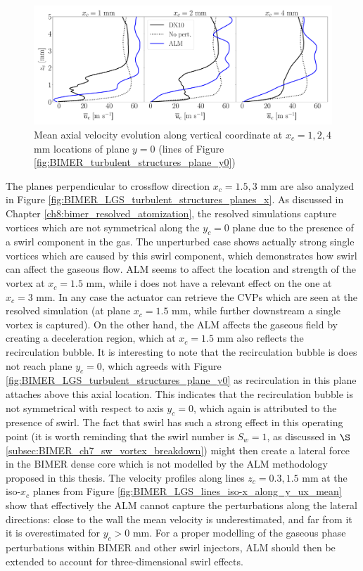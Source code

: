 \begin{figure}[ht]
\centering
   \includegraphics[scale=0.24]{./part3_applications/figures_ch9_lagrangian/gas_field_initial_conditions/lines_y0_along_z_ux_mean}
\caption{Mean axial velocity evolution along vertical coordinate at $x_c = 1, 2, 4$ mm locations of plane $y = 0$ (lines of Figure \ref{fig:BIMER_turbulent_structures_plane_y0})}
\label{fig:BIMER_LGS_lines_y0_along_z_ux_mean}
\end{figure}

The planes perpendicular to crossflow direction $x_c = 1.5, 3$ mm are also analyzed in Figure \ref{fig:BIMER_LGS_turbulent_structures_planes_x}.  As discussed in Chapter \ref{ch8:bimer_resolved_atomization}, the resolved simulations capture vortices which are not symmetrical along the $y_c = 0$ plane due to the presence of a swirl component in the gas. The unperturbed case shows actually strong single vortices which are caused by this swirl component, which demonstrates how swirl can affect the gaseous flow. ALM seems to affect the location and strength of the vortex at $x_c = 1.5$ mm, while i does not have a relevant effect on the one at $x_c = 3$ mm. In any case the actuator can retrieve the CVPs which are seen at the resolved simulation (at plane $x_c = 1.5$ mm, while further downstream a single vortex is captured). On the other hand, the ALM affects the gaseous field by creating a deceleration region, which at $x_c = 1.5$ mm also reflects the recirculation bubble. It is interesting to note that the recirculation bubble is does not reach plane $y_c = 0$, which agreeds with Figure \ref{fig:BIMER_LGS_turbulent_structures_plane_y0}  as recirculation in this plane attaches above this axial location. This indicates that the recirculation bubble is not symmetrical with respect to axis $y_c = 0$, which again is attributed to the presence of swirl. The fact that swirl has such a strong effect in this operating point (it is worth reminding that the swirl number is $S_w = 1$, as discussed in $\S$\ref{subsec:BIMER_ch7_sw_vortex_breakdown}) might then create a lateral force in the BIMER dense core which is not modelled by the ALM methodology proposed in this thesis. The velocity profiles along lines $z_c = 0.3, 1.5$ mm at the iso-$x_c$ planes from Figure \ref{fig:BIMER_LGS_lines_iso-x_along_y_ux_mean} show that effectively the ALM cannot capture the perturbations along the lateral directions: close to the wall the mean velocity is underestimated, and far from it it is overestimated for $y_c > 0$ mm. For a proper modelling of the gaseous phase perturbations within BIMER and other swirl injectors, ALM should then be extended to account for three-dimensional swirl effects. 


